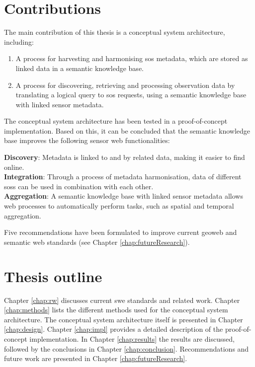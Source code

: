 \section{Contributions}
\label{contributions}

The main contribution of this thesis is a conceptual system architecture, including:
\begin{enumerate}
	\item A process for harvesting and harmonising \ac{sos} metadata, which are stored as linked data in a semantic knowledge base.
	\item A process for discovering, retrieving and processing observation data by translating a logical query to \ac{sos} requests, using a semantic knowledge base with linked sensor metadata. 
\end{enumerate}

\noindent The conceptual system architecture has been tested in a proof-of-concept implementation. Based on this, it can be concluded that the semantic knowledge base improves the following sensor web functionalities:\\
\begin{addmargin}[0.5cm]{0cm}
	\textbf{Discovery}: Metadata is linked to and by related data, making it easier to find online.\\
	\textbf{Integration}: Through a process of metadata harmonisation, data of different \aclp{sos} can be used in combination with each other.  \\
	\textbf{Aggregation}: A semantic knowledge base with linked sensor metadata allows web processes to automatically perform tasks, such as spatial and temporal aggregation. \\
\end{addmargin}

\noindent Five recommendations have been formulated to improve current geoweb and semantic web standards (see Chapter \ref{chap:futureResearch}).

\section{Thesis outline}
Chapter \ref{chap:rw} discusses current \ac{swe} standards and related work. Chapter \ref{chap:methods} lists the different methods used for the conceptual system architecture. The conceptual system architecture itself is presented in Chapter \ref{chap:design}. Chapter \ref{chap:impl} provides a detailed description of the proof-of-concept implementation. In Chapter \ref{chap:results} the results are discussed, followed by the conclusions in Chapter \ref{chap:conclusion}. Recommendations and future work are presented in Chapter \ref{chap:futureResearch}.      






